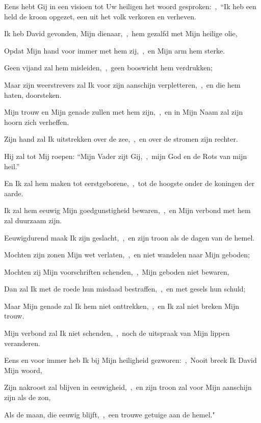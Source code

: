 \documentclass[12pt,twoside,a5paper]{article}
\begin{document}
\begin{halfparskip}

  Eens hebt Gij in een visioen tot Uw heiligen het woord gesproken:~\sep\ ``Ik heb een held de kroon opgezet, een uit het volk verkoren en verheven.

  Ik heb David gevonden, Mijn dienaar,~\sep\ hem gezalfd met Mijn heilige olie,

  Opdat Mijn hand voor immer met hem zij,~\sep\ en Mijn arm hem sterke.

  Geen vijand zal hem misleiden,~\sep\ geen booswicht hem verdrukken;

  Maar zijn weerstrevers zal Ik voor zijn aanschijn verpletteren,~\sep\ en die hem haten, doorsteken.

  Mijn trouw en Mijn genade zullen met hem zijn,~\sep\ en in Mijn Naam zal zijn hoorn zich verheffen.

  Zijn hand zal Ik uitstrekken over de zee,~\sep\ en over de stromen zijn rechter.

  Hij zal tot Mij roepen: ``Mijn Vader zijt Gij,~\sep\ mijn God en de Rots van mijn heil.''

  En Ik zal hem maken tot eerstgeborene,~\sep\ tot de hoogste onder de koningen der aarde.

  Ik zal hem eeuwig Mijn goedgunstigheid bewaren,~\sep\ en Mijn verbond met hem zal duurzaam zijn.

  Eeuwigdurend maak Ik zijn geslacht,~\sep\ en zijn troon als de dagen van de hemel.
\end{halfparskip}

\begin{halfparskip}

  Mochten zijn zonen Mijn wet verlaten,~\sep\ en niet wandelen naar Mijn geboden;

  Mochten zij Mijn voorschriften schenden,~\sep\ Mijn geboden niet bewaren,

  Dan zal Ik met de roede hun misdaad bestraffen,~\sep\ en met gesels hun schuld;

  Maar Mijn genade zal Ik hem niet onttrekken,~\sep\ en Ik zal niet breken Mijn trouw.

  Mijn verbond zal Ik niet schenden,~\sep\ noch de uitspraak van Mijn lippen veranderen.

  Eens en voor immer heb Ik bij Mijn heiligheid gezworen:~\sep\ Nooit breek Ik David Mijn woord,

  Zijn nakroost zal blijven in eeuwigheid,~\sep\ en zijn troon zal voor Mijn aanschijn zijn als de zon,

  Als de maan, die eeuwig blijft,~\sep\ een trouwe getuige aan de hemel."
\end{halfparskip}
\end{document}
